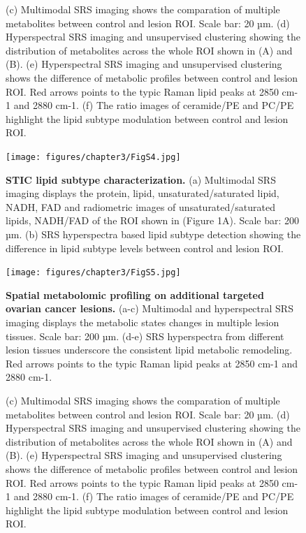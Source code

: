 \begin{refsection}
    \begin{figure}[h!]
        \ContinuedFloat
        \captionsetup{font=small}
        \caption[]{(c) Multimodal SRS imaging shows the comparation of multiple metabolites between control and lesion ROI. Scale bar: 20 µm. (d) Hyperspectral SRS imaging and unsupervised clustering showing the distribution of metabolites across the whole ROI shown in (A) and (B). (e) Hyperspectral SRS imaging and unsupervised clustering shows the difference of metabolic profiles between control and lesion ROI. Red arrows points to the typic Raman lipid peaks at 2850 cm-1 and 2880 cm-1. (f) The ratio images of ceramide/PE and PC/PE highlight the lipid subtype modulation between control and lesion ROI.}
    \end{figure}

    \begin{figure}[p]
        \begin{center}
            \texttt{[image: figures/chapter3/FigS4.jpg]}
            \captionsetup{font=small}
            \caption{ \textbf{STIC lipid subtype characterization.} (a) Multimodal SRS imaging displays the protein, lipid, unsaturated/saturated lipid, NADH, FAD and radiometric images of unsaturated/saturated lipids, NADH/FAD of the ROI shown in (Figure 1A). Scale bar: 200 µm. (b) SRS hyperspectra based lipid subtype detection showing the difference in lipid subtype levels between control and lesion ROI. }
            \label{chapter3_figS4}
        \end{center}
    \end{figure}
    

    \begin{figure}[p]
        \begin{center}
            \texttt{[image: figures/chapter3/FigS5.jpg]}
            \captionsetup{font=small}
            \caption{\textbf{Spatial metabolomic profiling on additional targeted ovarian cancer lesions.} (a-c) Multimodal and hyperspectral SRS imaging displays the metabolic states changes in multiple lesion tissues. Scale bar: 200 µm. (d-e) SRS hyperspectra from different lesion tissues underscore the consistent lipid metabolic remodeling. Red arrows points to the typic Raman lipid peaks at 2850 cm-1 and 2880 cm-1.}
            \label{chapter3_figS5}
        \end{center}
    \end{figure}
    
    \begin{figure}[h!]
        \ContinuedFloat
        \captionsetup{font=small}
        \caption[]{(c) Multimodal SRS imaging shows the comparation of multiple metabolites between control and lesion ROI. Scale bar: 20 µm. (d) Hyperspectral SRS imaging and unsupervised clustering showing the distribution of metabolites across the whole ROI shown in (A) and (B). (e) Hyperspectral SRS imaging and unsupervised clustering shows the difference of metabolic profiles between control and lesion ROI. Red arrows points to the typic Raman lipid peaks at 2850 cm-1 and 2880 cm-1. (f) The ratio images of ceramide/PE and PC/PE highlight the lipid subtype modulation between control and lesion ROI.}
    \end{figure}
    

\end{refsection}

